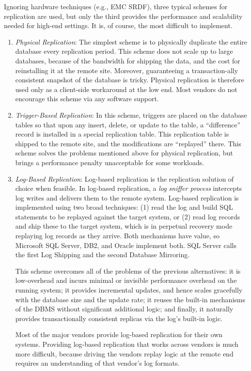 \documentclass[b5paper,11pt,twoside,openright]{book}
\begin{document}
Ignoring hardware techniques (e.g., EMC SRDF), three typical schemes for
replication are used, but only the third provides the performance and
scalability needed for high-end settings. It is, of course, the most
difficult to implement.

\begin{enumerate}
\def\labelenumi{\arabic{enumi}.}
\item
  \emph{Physical Replication}: The simplest scheme is to physically
  duplicate the entire database every replication period. This scheme
  does not scale up to large databases, because of the bandwidth for
  shipping the data, and the cost for reinstalling it at the remote
  site. Moreover, guaranteeing a transaction-ally consistent snapshot of
  the database is tricky. Physical replication is therefore used only as
  a client-side workaround at the low end. Most vendors do not encourage
  this scheme via any software support.
\item
  \emph{Trigger-Based Replication}: In this scheme, triggers are placed
  on the database tables so that upon any insert, delete, or update to
  the table, a ``difference'' record is installed in a special
  replication table. This replication table is shipped to the remote
  site, and the modifications are ``replayed'' there. This scheme solves
  the problems mentioned above for physical replication, but brings a
  performance penalty unacceptable for some workloads.

\item
  \emph{Log-Based Replication}: Log-based replication is the
  replication solution of choice when feasible. In log-based
  replication, a \emph{log sniffer process} intercepts log writes and
  delivers them to the remote system. Log-based replication is
  implemented using two broad techniques: (1) read the log and build
  SQL statements to be replayed against the target system, or (2) read
  log records and ship these to the target system, which is in
  perpetual recovery mode replaying log records as they arrive. Both
  mechanisms have value, so Microsoft SQL Server, DB2, and Oracle
  implement both. SQL Server calls the first Log Shipping and the
  second Database Mirroring.

This scheme overcomes all of the problems of the previous alternatives:
it is low-overhead and incurs minimal or invisible performance overhead
on the running system; it provides incremental updates, and hence
scales gracefully with the database size and the update rate; it reuses
the built-in mechanisms of the DBMS without significant additional
logic; and finally, it naturally provides transactionally consistent
replicas via the log's built-in logic.

Most of the major vendors provide log-based replication for their own
systems. Providing log-based replication that works across vendors is
much more difficult, because driving the vendors replay logic at the
remote end requires an understanding of that vendor's log formats.
\end{enumerate}
\end{document}
